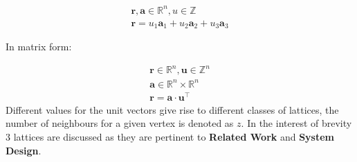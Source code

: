 \begin{equation}
    \begin{gathered}
         \mathbf{r}, \mathbf{a} \in \mathbb{R}^n, u \in \mathbb{Z} \\
         \mathbf{r} = u_1\mathbf{a}_1 + u_2\mathbf{a}_2 + u_3\mathbf{a}_3 
    \end{gathered}
\end{equation}
    \begin{center}
        In matrix form:
    \end{center}
\begin{equation}
    \begin{gathered}
         \mathbf{r} \in \mathbb{R}^n, \mathbf{u} \in \mathbb{Z}^n \\
         \mathbf{a} \in \mathbb{R}^n \times \mathbb{R}^n \\
         \mathbf{r} = \mathbf{a} \cdot \mathbf{u}^\top
    \end{gathered}
\end{equation}
Different values for the unit vectors give rise to different classes of lattices, the number
of neighbours for a given vertex is denoted as $z$.
In the interest of brevity 3 lattices are discussed as they are pertinent 
to  \textbf{Related Work} and \textbf{System Design}. \\
